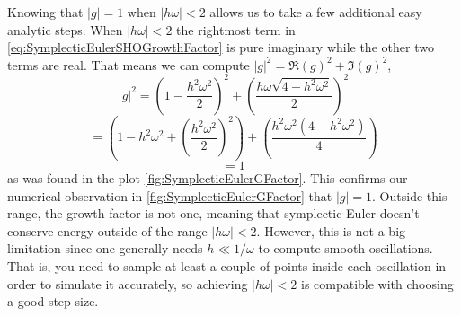 \documentclass[hidelinks,notitlepage]{book}
\begin{document}
Knowing that $|g| = 1$ when $|h \omega| < 2$ allows us to take a few additional easy analytic steps.  When $|h \omega| < 2$ the rightmost term in \cref{eq:SymplecticEulerSHOGrowthFactor} is pure imaginary while the other two terms are real.  That means we can compute $|g|^2 = \Re(g)^2 + \Im(g)^2$,
\begin{equation}
\nonumber
|g|^2 = \left(1 - \frac{h^2 \omega^2}{2}\right)^2 + \left( \frac{h \omega  \sqrt{4 - h^2 \omega^2}}{2} \right)^2
\end{equation}
\begin{equation}
\nonumber
= \left(1 - h^2 \omega^2 + \left( \frac{h^2 \omega^2}{2} \right)^2 \right) + \left( \frac{h^2 \omega^2  (4 - h^2 \omega^2)}{4} \right)
\end{equation}
\begin{equation}
\nonumber
= 1
\end{equation}
as was found in the plot \cref{fig:SymplecticEulerGFactor}.  This confirms our numerical observation in \cref{fig:SymplecticEulerGFactor} that $|g| = 1$.  Outside this range, the growth factor is not one, meaning that symplectic Euler doesn't conserve energy outside of the range 
$|h \omega| < 2$.  However, this is not a big limitation since one generally needs $h \ll 1/\omega$ to compute smooth oscillations.  That is, you need to sample at least a couple of points inside each oscillation in order to simulate it accurately, so achieving $|h \omega| < 2$ is compatible with choosing a good step size.
\end{document}
